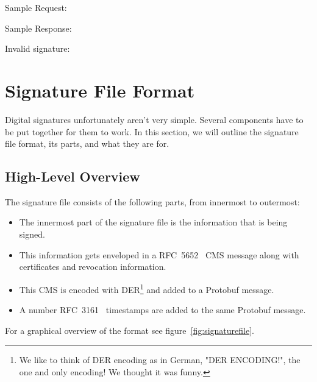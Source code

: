 Sample Request:


Sample Response:



Invalid signature:



\section{Signature File Format}\label{sec:signature-file-format}
Digital signatures unfortunately aren't very simple.
Several components have to be put together for them to work.
In this section, we will outline the signature file format,
its parts,
and what they are for.

\subsection{High-Level Overview}\label{subsec:high-level-overview}
The signature file consists of the following parts, from innermost to outermost:

\begin{itemize}
    \item The innermost part of the signature file is the information that is being signed.
    \item This information gets enveloped in a RFC~5652~\cite{rfc5652} \gls{CMS} message along with certificates and revocation information.
    \item This \gls{CMS} is encoded with \gls{DER}\footnote{We like to think of DER encoding as in German, "DER ENCODING!", the one and only encoding! We thought it was funny.} and added to a Protobuf message.
    \item A number RFC~3161~\cite{rfc3161} timestamps are added to the same Protobuf message.
\end{itemize}

For a graphical overview of the format see figure~\ref{fig:signaturefile}.

